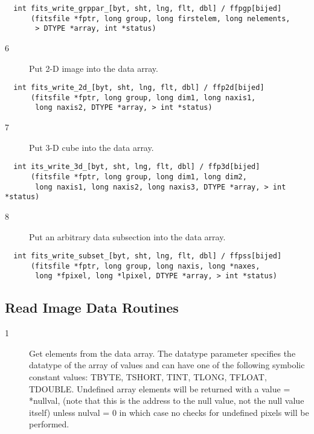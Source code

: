\begin{verbatim}
  int fits_write_grppar_[byt, sht, lng, flt, dbl] / ffpgp[bijed]
      (fitsfile *fptr, long group, long firstelem, long nelements,
       > DTYPE *array, int *status)
\end{verbatim}

\begin{description}
\item[6 ] Put 2-D image into the data array.
\end{description}

\begin{verbatim}
  int fits_write_2d_[byt, sht, lng, flt, dbl] / ffp2d[bijed]
      (fitsfile *fptr, long group, long dim1, long naxis1,
       long naxis2, DTYPE *array, > int *status)
\end{verbatim}

\begin{description}
\item[7 ] Put 3-D cube into the data array.
\end{description}

\begin{verbatim}
  int its_write_3d_[byt, sht, lng, flt, dbl] / ffp3d[bijed]
      (fitsfile *fptr, long group, long dim1, long dim2,
       long naxis1, long naxis2, long naxis3, DTYPE *array, > int *status)
\end{verbatim}

\begin{description}
\item[8 ]   Put an arbitrary data subsection into the data array.
\end{description}

\begin{verbatim}
  int fits_write_subset_[byt, sht, lng, flt, dbl] / ffpss[bijed]
      (fitsfile *fptr, long group, long naxis, long *naxes,
       long *fpixel, long *lpixel, DTYPE *array, > int *status)
\end{verbatim}


\subsection{ Read Image Data Routines \label{FFGPV}}


\begin{description}
\item[1 ] Get elements from the data array.  The datatype parameter specifies
    the datatype of the array of values and can have one of the following
    symbolic constant values: TBYTE, TSHORT, TINT, TLONG, TFLOAT, TDOUBLE.
    Undefined array elements will be returned with a value = *nullval,
    (note that this is the address to the null value, not the null value
    itself) unless nulval = 0 in which case no checks for undefined pixels
   will be performed.
\end{description}

